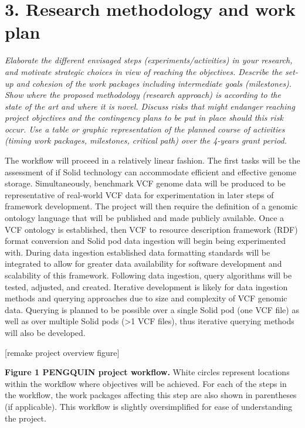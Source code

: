 \documentclass{article}
\begin{document}
\section{3. Research methodology and work plan}
\textit{Elaborate the different envisaged steps (experiments/activities) in your research, and motivate strategic choices in view of reaching the objectives. Describe the set-up and cohesion of the work packages including intermediate goals (milestones).
Show where the proposed methodology (research approach) is according to the state of the art and where it is novel. Discuss risks that might endanger reaching project objectives and the contingency plans to be put in place should this risk occur.
Use a table or graphic representation of the planned course of activities (timing work packages, milestones, critical path) over the 4-years grant period.}

The workflow will proceed in a relatively linear fashion. The first tasks will be the assessment of if Solid technology can accommodate efficient and effective genome storage. Simultaneously, benchmark VCF genome data will be produced to be representative of real-world VCF data for experimentation in later steps of framework development. The project will then require the definition of a genomic ontology language that will be published and made publicly available. Once a VCF ontology is established, then VCF to resource description framework (RDF) format conversion and Solid pod data ingestion will begin being experimented with. During data ingestion established data formatting standards will be integrated to allow for greater data availability for software development and scalability of this framework. Following data ingestion, query algorithms will be tested, adjusted, and created. Iterative development is likely for data ingestion methods and querying approaches due to size and complexity of VCF genomic data. Querying is planned to be possible over a single Solid pod (one VCF file) as well as over multiple Solid pods (>1 VCF files), thus iterative querying methods will also be developed. 

[remake project overview figure]

\textbf{Figure 1 PENGQUIN project workflow.} White circles represent locations within the workflow where objectives will be achieved. For each of the steps in the workflow, the work packages affecting this step are also shown in parentheses (if applicable). This workflow is slightly oversimplified for ease of understanding the project.
\end{document}
